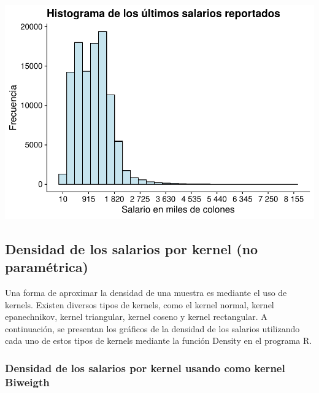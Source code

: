 \documentclass[
]{article}
\newenvironment{Shaded}{\begin{snugshade}}{\end{snugshade}}
\newcommand{\AttributeTok}[1]{\textcolor[rgb]{0.13,0.29,0.53}{#1}}
\newcommand{\FunctionTok}[1]{\textcolor[rgb]{0.13,0.29,0.53}{\textbf{#1}}}
\newcommand{\NormalTok}[1]{#1}
\newcommand{\OtherTok}[1]{\textcolor[rgb]{0.56,0.35,0.01}{#1}}
\newcommand{\SpecialCharTok}[1]{\textcolor[rgb]{0.81,0.36,0.00}{\textbf{#1}}}
\newcommand{\StringTok}[1]{\textcolor[rgb]{0.31,0.60,0.02}{#1}}
\begin{document}
\includegraphics{Tarea1_files/figure-latex/unnamed-chunk-12-1.pdf}

\hypertarget{densidad-de-los-salarios-por-kernel-no-paramuxe9trica}{%
\subsection{Densidad de los salarios por kernel (no
paramétrica)}\label{densidad-de-los-salarios-por-kernel-no-paramuxe9trica}}

Una forma de aproximar la densidad de una muestra es mediante el uso de
kernels. Existen diversos tipos de kernels, como el kernel normal,
kernel epanechnikov, kernel triangular, kernel coseno y kernel
rectangular. A continuación, se presentan los gráficos de la densidad de
los salarios utilizando cada uno de estos tipos de kernels mediante la
función Density en el programa R.

\hypertarget{densidad-de-los-salarios-por-kernel-usando-como-kernel-biweigth}{%
\subsubsection{Densidad de los salarios por kernel usando como kernel
Biweigth}\label{densidad-de-los-salarios-por-kernel-usando-como-kernel-biweigth}}

\begin{Shaded}
\end{Shaded}
\end{document}
